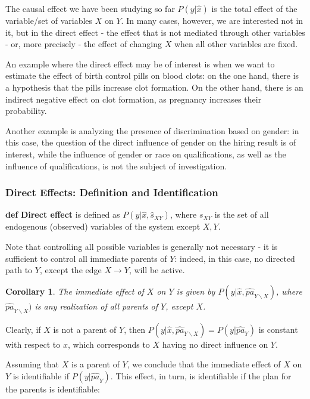 \documentclass[fleqn]{article}
\def\define#1{\textbf{def} \textbf{#1}}
\newtheorem{corollary}{Corollary}
\numberwithin{equation}{section}
\numberwithin{theorem}{section}
\numberwithin{figure}{section}
\numberwithin{lemma}{section}
\numberwithin{corollary}{section}
\begin{document}
The causal effect we have been studying so far $P(y|\hat x)$ is the total effect of the variable/set of variables $X$ on $Y$. In many cases, however, we are interested not in it, but in the direct effect - the effect that is not mediated through other variables - or, more precisely - the effect of changing $X$ when all other variables are fixed.

An example where the direct effect may be of interest is when we want to estimate the effect of birth control pills on blood clots: on the one hand, there is a hypothesis that the pills increase clot formation. On the other hand, there is an indirect negative effect on clot formation, as pregnancy increases their probability.

Another example is analyzing the presence of discrimination based on gender: in this case, the question of the direct influence of gender on the hiring result is of interest, while the influence of gender or race on qualifications, as well as the influence of qualifications, is not the subject of investigation.

\subsubsection*{Direct Effects: Definition and Identification}

\define{Direct effect} is defined as $P(y|\hat x, \hat s_{XY})$, where $s_{XY}$ is the set of all endogenous (observed) variables of the system except $X,Y$.

Note that controlling all possible variables is generally not necessary - it is sufficient to control all immediate parents of $Y$: indeed, in this case, no directed path to $Y$, except the edge $X \rightarrow Y$, will be active.

\begin{corollary}
	The immediate effect of $X$ on $Y$ is given by $P(y|\hat x, \hat{pa}_{Y \backslash X})$, where $\hat{pa}_{Y \backslash X})$ is any realization of all parents of $Y$, except $X$.
\end{corollary}

Clearly, if $X$ is not a parent of $Y$, then $P(y|\hat x, \hat{pa}_{Y \backslash X}) = P(y|\hat{pa}_{Y})$ is constant with respect to $x$, which corresponds to $X$ having no direct influence on $Y$.

Assuming that $X$ is a parent of $Y$, we conclude that the immediate effect of $X$ on $Y$ is identifiable if $P(y|\hat{pa}_Y)$. This effect, in turn, is identifiable if the plan for the parents is identifiable:
\end{document}

